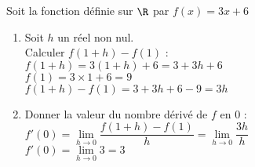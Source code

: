 \documentclass[11pt]{article}
\begin{document}
\phantom{0}
\vspace{-1cm}
\begin{center}
\end{center}

\begin{exercice}
Soit la fonction définie sur $\R$ par $f(x)=3x+6$
\begin{enumerate}
\item Soit $h$ un réel non nul. \\
Calculer $f(1+h)-f(1)$ : \\
$f(1+h) = 3(1+h)+6 = 3+3h+6$ \\
$f(1)=3 \times 1 + 6 = 9$ \\
$f(1+h)-f(1)=3+3h+6-9=3h$
\item Donner la valeur du nombre dérivé de $f$ en $0$ : \\
$f'(0)=\lim\limits_{h\to0}\dfrac{f(1+h)-f(1)}{h}=\lim\limits_{h\to0}\dfrac{3h}{h}$ \\
$f'(0)=\lim\limits_{h\to0}3=3$
\end{enumerate}
\end{exercice}
\end{document}
